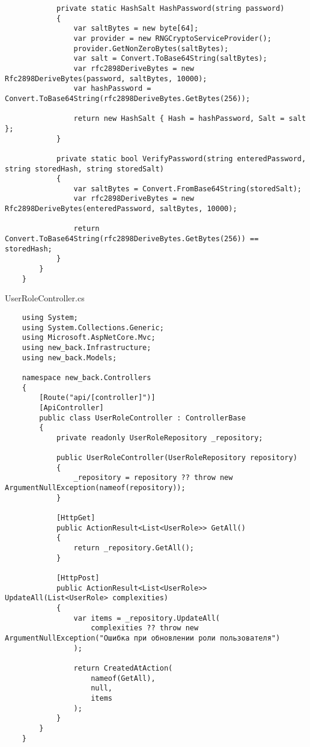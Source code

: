 \begin{lstlisting}
            private static HashSalt HashPassword(string password)
            {
                var saltBytes = new byte[64];
                var provider = new RNGCryptoServiceProvider();
                provider.GetNonZeroBytes(saltBytes);
                var salt = Convert.ToBase64String(saltBytes);
                var rfc2898DeriveBytes = new Rfc2898DeriveBytes(password, saltBytes, 10000);
                var hashPassword = Convert.ToBase64String(rfc2898DeriveBytes.GetBytes(256));
    
                return new HashSalt { Hash = hashPassword, Salt = salt };
            }
            
            private static bool VerifyPassword(string enteredPassword, string storedHash, string storedSalt)
            {
                var saltBytes = Convert.FromBase64String(storedSalt);
                var rfc2898DeriveBytes = new Rfc2898DeriveBytes(enteredPassword, saltBytes, 10000);
                
                return Convert.ToBase64String(rfc2898DeriveBytes.GetBytes(256)) == storedHash;
            }
        }
    }    
\end{lstlisting}

UserRoleController.cs
\lstset{style=sharpc}
\begin{lstlisting}
    using System;
    using System.Collections.Generic;
    using Microsoft.AspNetCore.Mvc;
    using new_back.Infrastructure;
    using new_back.Models;
    
    namespace new_back.Controllers
    {
        [Route("api/[controller]")]
        [ApiController]
        public class UserRoleController : ControllerBase
        {
            private readonly UserRoleRepository _repository;
            
            public UserRoleController(UserRoleRepository repository)
            {
                _repository = repository ?? throw new ArgumentNullException(nameof(repository));
            }
            
            [HttpGet]
            public ActionResult<List<UserRole>> GetAll()
            {
                return _repository.GetAll();
            }
            
            [HttpPost]
            public ActionResult<List<UserRole>> UpdateAll(List<UserRole> complexities)
            {
                var items = _repository.UpdateAll(
                    complexities ?? throw new ArgumentNullException("Ошибка при обновлении роли пользователя")
                );
    
                return CreatedAtAction(
                    nameof(GetAll),
                    null,
                    items
                );
            }
        }
    }
\end{lstlisting}

